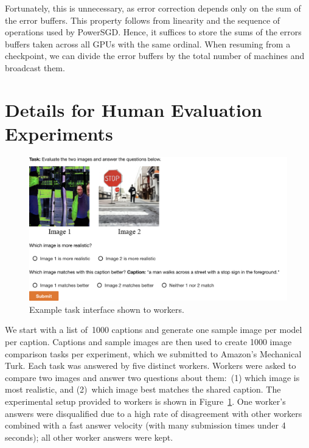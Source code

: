 \documentclass{article}
\begin{document}
\begin{enumerate}
    Fortunately, this is unnecessary, as error correction depends only on the sum of the error buffers. This property follows from linearity and the sequence of operations used by PowerSGD. Hence, it suffices to store the sums of the errors buffers taken across all GPUs with the same ordinal. When resuming from a checkpoint, we can divide the error buffers by the total number of machines and broadcast them.
\end{enumerate}

\section{Details for Human Evaluation Experiments}
\label{sec:human_eval}
%
\begin{figure}[t]
    \centering
    \includegraphics[width=\linewidth]{example_human_evals_task.png}
    \caption{Example task interface shown to workers.}
    \label{fig:example_human_evals_task}
\end{figure}
%
We start with a list of~\num{1000} captions and generate one sample image per model per caption. Captions and sample images are then used to create \num{1000} image comparison tasks per experiment, which we submitted to Amazon's Mechanical Turk. Each task was answered by five distinct workers. Workers were asked to compare two images and answer two questions about them:~(1) which image is most realistic, and (2)~which image best matches the shared caption. The experimental setup provided to workers is shown in Figure~\ref{fig:example_human_evals_task}. One worker's answers were disqualified due to a high rate of disagreement with other workers combined with a fast answer velocity (with many submission times under 4 seconds); all other worker answers were kept.
\end{document}

